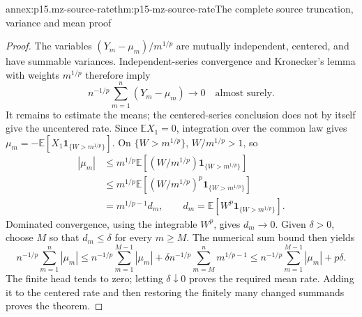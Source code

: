 \begin{annexitem}{annex:p15.mz-source-rate}{thm:p15-mz-source-rate}{The complete source truncation, variance and mean proof}
\begin{proof}
The variables \((Y_m-\mu_m)/m^{1/p}\) are mutually independent,
centered, and have summable variances. Independent-series convergence
and Kronecker's lemma with weights \(m^{1/p}\) therefore imply
\[
 n^{-1/p}\sum_{m=1}^n(Y_m-\mu_m)\longrightarrow0
                                      \quad\text{almost surely}.
\]
It remains to estimate the means; the centered-series conclusion
does not by itself give the uncentered rate.
Since \(\mathbb EX_1=0\), integration over the common law gives
\(\mu_m=-\mathbb E[X_1\mathbf1_{\{W>m^{1/p}\}}]\).
On \(\{W>m^{1/p}\}\), \(W/m^{1/p}>1\), so
\[
 \begin{aligned}
 |\mu_m|
 &\leq m^{1/p}\mathbb E\!\left[
       (W/m^{1/p})\mathbf1_{\{W>m^{1/p}\}}\right]\\
 &\leq m^{1/p}\mathbb E\!\left[
       (W/m^{1/p})^p\mathbf1_{\{W>m^{1/p}\}}\right]\\
 &=m^{1/p-1}d_m,\qquad
 d_m=\mathbb E[W^p\mathbf1_{\{W>m^{1/p}\}}].
 \end{aligned}
\]
Dominated convergence, using the integrable \(W^p\), gives \(d_m\to0\).
Given \(\delta>0\), choose \(M\) so that \(d_m\leq\delta\)
for every \(m\geq M\). The numerical sum bound then yields
\[
 n^{-1/p}\sum_{m=1}^n|\mu_m|
  \leq n^{-1/p}\sum_{m=1}^{M-1}|\mu_m|
       +\delta n^{-1/p}\sum_{m=M}^n m^{1/p-1}
  \leq n^{-1/p}\sum_{m=1}^{M-1}|\mu_m|+p\delta .
\]
The finite head tends to zero; letting \(\delta\downarrow0\)
proves the required mean rate. Adding it to the centered rate and
then restoring the finitely many changed summands proves the theorem.
\end{proof}
\end{annexitem}

